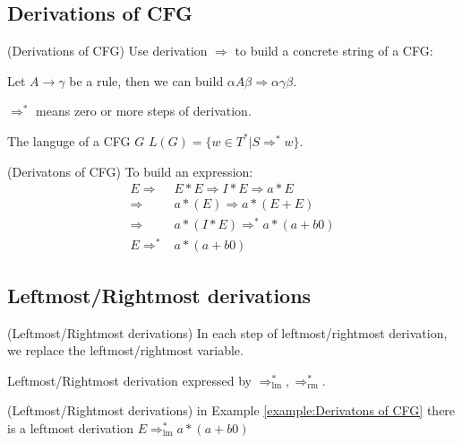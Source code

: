         \subsection{Derivations of CFG}
        \begin{definition}
            (Derivations of CFG) Use derivation $\Rightarrow $ to build a concrete string of a CFG:

            Let $A\rightarrow \gamma$ be a rule, then we can build $\alpha A\beta \Rightarrow \alpha \gamma \beta$.

            $\Rightarrow ^{*}$ means zero or more steps of derivation.

            The languge of a CFG $G$ $L(G)=\{w\in T^{*}|S\Rightarrow ^{*}w\}$.
        \end{definition}
        
        \begin{example}
            \label{example:Derivatons of CFG}
            (Derivatons of CFG) To build an expression:
            \begin{align}
                E\Rightarrow&E*E\Rightarrow I*E\Rightarrow a*E\nonumber\\
                \Rightarrow &a*(E)\Rightarrow a*(E+E)\nonumber\\
                \Rightarrow &a*(I*E)\Rightarrow ^{*}a*(a+b 0)\nonumber\\
                E\Rightarrow ^{*}&a*(a+b 0)\nonumber
            \end{align}
        \end{example}
        \subsection{Leftmost/Rightmost derivations}
        \begin{definition}
            (Leftmost/Rightmost derivations) In each step of leftmost/rightmost derivation, we replace the leftmost/rightmost variable.
        \end{definition}
        Leftmost/Rightmost derivation expressed by $\Rightarrow ^{*}_{\mathrm{lm}},\Rightarrow ^{*}_{\mathrm{r m}}$.
        \begin{example}
            (Leftmost/Rightmost derivations) in Example \ref{example:Derivatons of CFG} there is a leftmost derivation $E\Rightarrow ^{*}_{\mathrm{lm}}a*(a+b0)$
        \end{example}
